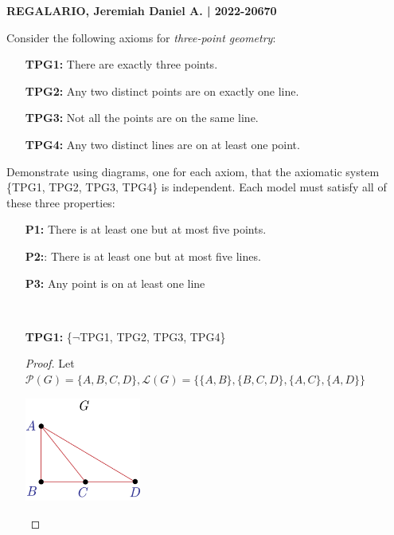 \documentclass[a4paper, 10pt]{exam}
\begin{document}
\textbf{REGALARIO, Jeremiah Daniel A. | 2022-20670}
\begin{questions}
    \question Consider the following axioms for \textit{three-point geometry}:
    \begin{enumerate}
        \item[] \textbf{TPG1:} There are exactly three points.
        \item[] \textbf{TPG2:} Any two distinct points are on exactly one line.
        \item[] \textbf{TPG3:} Not all the points are on the same line.
        \item[] \textbf{TPG4:} Any two distinct lines are on at least one point.
    \end{enumerate}
    Demonstrate using diagrams, one for each axiom, that the axiomatic system \{TPG1, TPG2, TPG3, TPG4\} is independent. Each model must satisfy all of these three properties: 
    \begin{enumerate}
        \item[] \textbf{P1:} There is at least one but at most five points.
        \item[] \textbf{P2:}: There is at least one but at most five lines.
        \item[] \textbf{P3:} Any point is on at least one line
    \end{enumerate} \\

    \begin{enumerate}
      \item[\textbf{TPG1:}] \{$\neg$TPG1, TPG2, TPG3, TPG4\}
      \begin{proof}
            Let $\mathscr{P}(G) = \{A, B, C, D\}, \mathscr{L}(G) = \{\{A, B\},\{B, C, D\}, \{A, C\}, \{A, D\} \}$
            \begin{center}
                \includegraphics[width=0.3\textwidth]{3.1.png} \\
                  

\end{center}
\end{proof}
\end{enumerate}
\end{questions}
\end{document}
